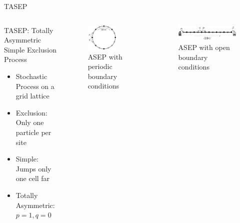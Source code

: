 \documentclass[10pt,xcolor=table, aspectratio=1610]{beamer}
\begin{document}
\begin{frame}{TASEP}
    \begin{columns}
      \begin{block}{TASEP: \alert<4>{Totally Asymmetric} \alert<3>{Simple} \alert<2>{Exclusion} \alert<1>{Process}}
      \begin{itemize}
        \item<1-> Stochastic Process on a grid lattice
        \item<2-> Exclusion: Only one particle per site
        \item<3-> Simple: Jumps only one cell far 
        \item<4-> Totally Asymmetric: $p=1,q=0$
      \end{itemize}
      \end{block}
      \begin{figure}
        \includegraphics[width=0.7\textwidth]{../Thesis/img/model/out/tasep_a.pdf}
        \caption*{ASEP with periodic boundary conditions}
      \end{figure}
      \begin{figure}
        \includegraphics[width=\textwidth]{../Thesis/img/model/out/tasep_b.pdf}
        \caption*{ASEP with open boundary conditions}
      \end{figure}
    \end{columns}
\end{frame}
\end{document}
